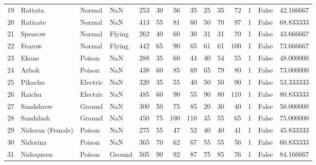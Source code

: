 \begin{tabular}{rlllrrrrrrrrlr}
  19 &                    Rattata &    Normal &       NaN &    253 &   30 &      56 &       35 &       25 &       35 &     72 &           1 &      False &   42.166667 \\
  20 &                   Raticate &    Normal &       NaN &    413 &   55 &      81 &       60 &       50 &       70 &     97 &           1 &      False &   68.833333 \\
  21 &                    Spearow &    Normal &    Flying &    262 &   40 &      60 &       30 &       31 &       31 &     70 &           1 &      False &   43.666667 \\
  22 &                     Fearow &    Normal &    Flying &    442 &   65 &      90 &       65 &       61 &       61 &    100 &           1 &      False &   73.666667 \\
  23 &                      Ekans &    Poison &       NaN &    288 &   35 &      60 &       44 &       40 &       54 &     55 &           1 &      False &   48.000000 \\
  24 &                      Arbok &    Poison &       NaN &    438 &   60 &      85 &       69 &       65 &       79 &     80 &           1 &      False &   73.000000 \\
  25 &                    Pikachu &  Electric &       NaN &    320 &   35 &      55 &       40 &       50 &       50 &     90 &           1 &      False &   53.333333 \\
  26 &                     Raichu &  Electric &       NaN &    485 &   60 &      90 &       55 &       90 &       80 &    110 &           1 &      False &   80.833333 \\
  27 &                  Sandshrew &    Ground &       NaN &    300 &   50 &      75 &       85 &       20 &       30 &     40 &           1 &      False &   50.000000 \\
  28 &                  Sandslash &    Ground &       NaN &    450 &   75 &     100 &      110 &       45 &       55 &     65 &           1 &      False &   75.000000 \\
  29 &           Nidoran (Female) &    Poison &       NaN &    275 &   55 &      47 &       52 &       40 &       40 &     41 &           1 &      False &   45.833333 \\
  30 &                   Nidorina &    Poison &       NaN &    365 &   70 &      62 &       67 &       55 &       55 &     56 &           1 &      False &   60.833333 \\
  31 &                  Nidoqueen &    Poison &    Ground &    505 &   90 &      92 &       87 &       75 &       85 &     76 &           1 &      False &   84.166667 \\

\end{tabular}
